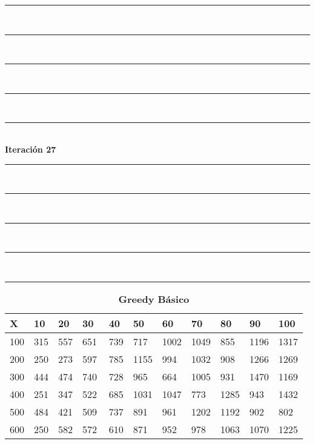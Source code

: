 \documentclass[10pt,letterpaper]{article}
\begin{document}
\newpage 
\begin{center}
\newcommand{\HRule}{\rule{\linewidth}{0.5mm}}
\center
\HRule\\[6cm]
\HRule\\[0.4cm]
\HRule\\[0.4cm]
\HRule\\[0.4cm]
\HRule\\[0.4cm]
{\centering \Huge\bfseries Iteración 27}\\[0.4cm]
\HRule\\[0.4cm]
\HRule\\[0.4cm]
\HRule\\[0.4cm]
\HRule\\[6cm]
\HRule
\end{center}
\newpage 
{}
\begin{center}
\begin{table}\renewcommand{\arraystretch}{2.5}
\caption{\large \textbf{Greedy Básico}}
\centering
\begin{tabular} { |m{0.5cm}|m{1.3cm}|m{1.3cm}|m{1.3cm}|m{1.3cm}|m{1.3cm}|m{1.3cm}|m{1.3cm}|m{1.3cm}|m{1.3cm}|m{1.3cm}|} 
\hline
\rowcolor{Gray}
\centering \textbf{X} & \centering \textbf{10} & \centering \textbf{20} & \centering \textbf{30}\ & \centering \textbf{40} & \centering \textbf{50} & \centering \textbf{60}\ & \centering \textbf{70} & \centering \textbf{80} & \centering \textbf{90}\ & \textbf{100} \\\hline
\cellcolor{Gray}100 & \Large 315 & \Large 557 & \Large 651 & \Large 739 & \Large 717 & \Large 1002 & \Large 1049 & \Large 855 & \Large 1196 & \Large 1317 \\
\hline
\cellcolor{Gray}200 & \Large 250 & \Large 273 & \Large 597 & \Large 785 & \Large 1155 & \Large 994 & \Large 1032 & \Large 908 & \Large 1266 & \Large 1269 \\
\hline
\cellcolor{Gray}300 & \Large 444 & \Large 474 & \Large 740 & \Large 728 & \Large 965 & \Large 664 & \Large 1005 & \Large 931 & \Large 1470 & \Large 1169 \\
\hline
\cellcolor{Gray}400 & \Large 251 & \Large 347 & \Large 522 & \Large 685 & \Large 1031 & \Large 1047 & \Large 773 & \Large 1285 & \Large 943 & \Large 1432 \\
\hline
\cellcolor{Gray}500 & \Large 484 & \Large 421 & \Large 509 & \Large 737 & \Large 891 & \Large 961 & \Large 1202 & \Large 1192 & \Large 902 & \Large 802 \\
\hline
\cellcolor{Gray}600 & \Large 250 & \Large 582 & \Large 572 & \Large 610 & \Large 871 & \Large 952 & \Large 978 & \Large 1063 & \Large 1070 & \Large 1225 \\

\end{tabular}
\end{table}
\end{center}
\end{document}
